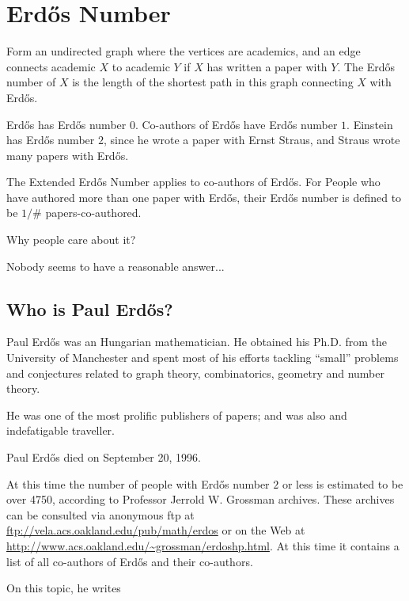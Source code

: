 \section{Erd\H os Number}

Form an undirected graph where the vertices are academics, and an edge
connects academic $X$ to academic $Y$ if $X$ has written a paper with
$Y$. The Erd\H os number of $X$ is the length of the shortest path in
this graph connecting $X$ with Erd\H os.

Erd\H os has Erd\H os number $0$.  Co-authors of Erd\H os have Erd\H os
number $1$.  Einstein has Erd\H os number $2$, since he wrote a paper
with Ernst Straus, and Straus wrote many papers with Erd\H os.


The Extended Erd\H os Number applies to co-authors of Erd\H os.  For
People who have authored more than one paper with Erd\H os, their Erd\H
os number is defined to be $1/\#$ papers-co-authored.

Why people care about it?

Nobody seems to have a reasonable answer...

\subsection{Who is Paul Erd\H os?}

Paul Erd\H os was an Hungarian mathematician. He obtained his Ph.D.
from the University of Manchester and spent most of his efforts tackling
``small'' problems and conjectures related to graph theory,
combinatorics, geometry and number theory.

He was one of the most prolific publishers of papers; and was also and
indefatigable traveller.

Paul Erd\H os died on September 20, 1996.

At this time the number of people with Erd\H os number $2$ or less is
estimated to be over 4750, according to Professor Jerrold W. Grossman
archives. These archives can be consulted via anonymous ftp at
\url{ftp://vela.acs.oakland.edu/pub/math/erdos} or on the Web at
\url{http://www.acs.oakland.edu/~grossman/erdoshp.html}.  At this time
it contains a list of all co-authors of Erd\H os and their co-authors.

On this topic, he writes

